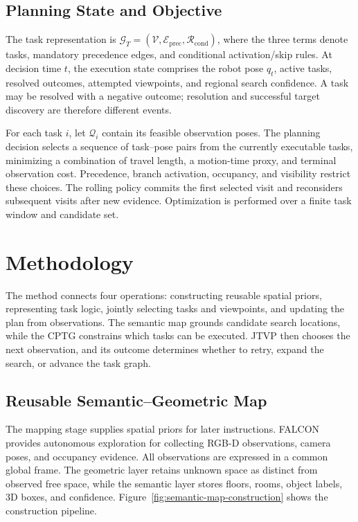 \documentclass[letterpaper,10pt,journal]{IEEEtran}
\begin{document}
\subsection{Planning State and Objective}
The task representation is $\mathcal G_T=(\mathcal V,\mathcal E_{\mathrm{prec}},\mathcal R_{\mathrm{cond}})$, where the three terms denote tasks, mandatory precedence edges, and conditional activation/skip rules. At decision time $t$, the execution state comprises the robot pose $q_t$, active tasks, resolved outcomes, attempted viewpoints, and regional search confidence. A task may be resolved with a negative outcome; resolution and successful target discovery are therefore different events.

For each task $i$, let $\mathcal Q_i$ contain its feasible observation poses. The planning decision selects a sequence of task--pose pairs from the currently executable tasks, minimizing a combination of travel length, a motion-time proxy, and terminal observation cost. Precedence, branch activation, occupancy, and visibility restrict these choices. The rolling policy commits the first selected visit and reconsiders subsequent visits after new evidence. Optimization is performed over a finite task window and candidate set.

\section{Methodology}
The method connects four operations: constructing reusable spatial priors, representing task logic, jointly selecting tasks and viewpoints, and updating the plan from observations. The semantic map grounds candidate search locations, while the CPTG constrains which tasks can be executed. JTVP then chooses the next observation, and its outcome determines whether to retry, expand the search, or advance the task graph.

\subsection{Reusable Semantic--Geometric Map}
\label{sec:semantic-representation}
The mapping stage supplies spatial priors for later instructions. FALCON~\cite{zhang2024falcon} provides autonomous exploration for collecting RGB-D observations, camera poses, and occupancy evidence. All observations are expressed in a common global frame. The geometric layer retains unknown space as distinct from observed free space, while the semantic layer stores floors, rooms, object labels, 3D boxes, and confidence. Figure~\ref{fig:semantic-map-construction} shows the construction pipeline.
\end{document}
